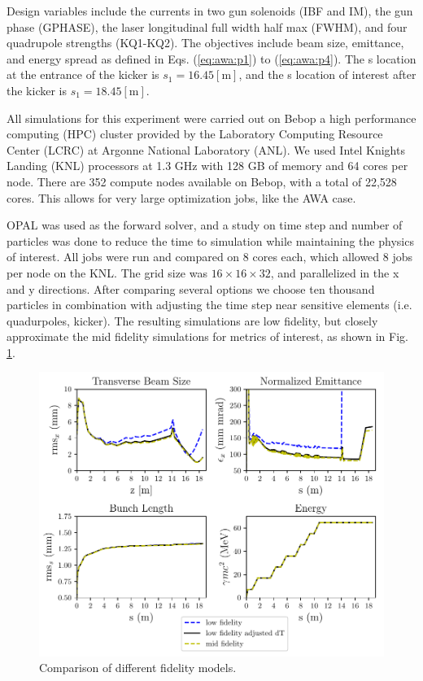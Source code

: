 Design variables include the currents in two gun solenoids (IBF and IM), 
the gun phase (GPHASE), the laser longitudinal full width half max (FWHM), 
and four quadrupole strengths (KQ1-KQ2). The objectives include
beam size, emittance, and energy spread as
defined in Eqs. (\ref{eq:awa:p1}) to (\ref{eq:awa:p4}). 
The s location at the entrance of the kicker is $s_1=16.45[\text{m}]$, 
and the s location of interest after the kicker is $s_1=18.45[\text{m}]$. 

All simulations for this experiment were carried out on Bebop a
high performance computing (HPC)
cluster provided by the Laboratory Computing Resource Center (LCRC)
at Argonne National Laboratory (ANL). We used Intel Knights Landing 
(KNL) processors at 1.3 GHz with 128 GB of memory 
and 64 cores per node. There are 352 compute nodes available on 
Bebop, with a total of 22,528 cores. 
This allows for very large optimization jobs, like the AWA case.

OPAL was used as the forward solver, and a study on time step and 
number of particles was done to reduce the time to simulation while 
maintaining the physics of interest. All jobs were run and compared 
on 8 cores each, which allowed 8 jobs per node on the KNL.
The grid size was $16 \times 16 \times 32$, 
and parallelized in the x and y directions.
After comparing several options we choose ten thousand particles 
in combination with adjusting the time step near sensitive elements 
(i.e. quadurpoles, kicker). 
The resulting simulations are low fidelity, but closely approximate 
the mid fidelity simulations for metrics of interest, as shown in 
Fig. \ref{tstep}.

\begin{figure}
	\centering
	\includegraphics[width=0.8\linewidth]{Report/timestep_comparison}
	\caption{Comparison of different fidelity models.}
	\label{tstep}
\end{figure}


